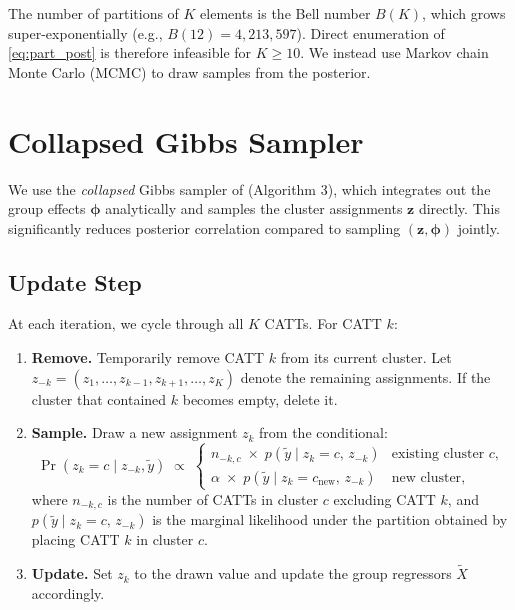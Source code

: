 \documentclass[12pt]{article}
\newcommand{\1}{\mathbbm{1}}
\newcommand{\ytd}{\tilde{y}}
\newcommand{\Xtd}{\tilde{X}}
\begin{document}
The number of partitions of $K$ elements is the Bell number $B(K)$, which
grows super-exponentially (e.g., $B(12)=4{,}213{,}597$). Direct enumeration
of \eqref{eq:part_post} is therefore infeasible for $K\geq 10$. We instead
use Markov chain Monte Carlo (MCMC) to draw samples from the posterior.

\section{Collapsed Gibbs Sampler}

We use the \emph{collapsed} Gibbs sampler of \citet{neal2000} (Algorithm 3),
which integrates out the group effects $\bm{\phi}$ analytically and samples
the cluster assignments $\bm{z}$ directly. This significantly reduces
posterior correlation compared to sampling $(\bm{z}, \bm{\phi})$ jointly.

\subsection{Update Step}

At each iteration, we cycle through all $K$ CATTs. For CATT $k$:

\begin{enumerate}
  \item \textbf{Remove.} Temporarily remove CATT $k$ from its current cluster.
    Let $z_{-k} = (z_1,\ldots,z_{k-1},z_{k+1},\ldots,z_K)$ denote the remaining
    assignments. If the cluster that contained $k$ becomes empty, delete it.

  \item \textbf{Sample.} Draw a new assignment $z_k$ from the conditional:
    \begin{equation}
      \Pr(z_k = c \mid z_{-k},\ytd) \;\propto\;
        \begin{cases}
          n_{-k,c}\;\times\; p(\ytd\mid z_k = c,\, z_{-k}) & \text{existing cluster }c, \\[4pt]
          \alpha \;\times\; p(\ytd\mid z_k = c_{\mathrm{new}},\, z_{-k}) & \text{new cluster},
        \end{cases}
      \label{eq:gibbs}
    \end{equation}
    where $n_{-k,c}$ is the number of CATTs in cluster $c$ excluding CATT $k$,
    and $p(\ytd\mid z_k = c,\, z_{-k})$ is the marginal likelihood under the
    partition obtained by placing CATT $k$ in cluster $c$.

  \item \textbf{Update.} Set $z_k$ to the drawn value and update the group
    regressors $\Xtd$ accordingly.
\end{enumerate}
\end{document}
